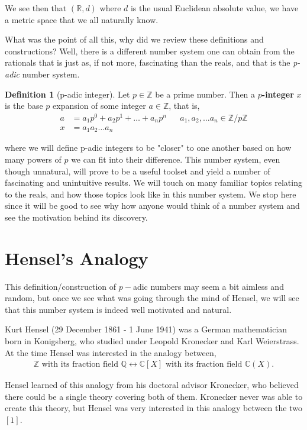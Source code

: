 \documentclass[12pt]{article}
\theoremstyle{definition}
\newtheorem{definition}{Definition}[section]
\theoremstyle{remark}
\newcommand{\zz}{\mathbb Z}   %
\newcommand{\qq}{\mathbb Q}   %
\newcommand{\rr}{\mathbb R}   %
\newcommand{\cc}{\mathbb C}   %
\newcommand{\lrb}[1]{\left[#1\right]}
\begin{document}
We see then that $(\rr, d)$ where $d$ is the usual Euclidean absolute value, we have a metric space that we all naturally know. 

What was the point of all this, why did we review these definitions and constructions? Well, there is a different number system one can obtain from the rationals that is just as, if not more, fascinating than the reals, and that is the \textit{p-adic} number system. 

\begin{definition} [p-adic integer]
  Let $p \in \zz$ be a prime number. Then a \textbf{$p$-integer} $x$ is the base $p$ expansion of some integer $a\in \zz$, that is,
  \begin{align*}
    a &= a_1p^{0} + a_2p^{1} + \dots + a_np^{n}  && a_1,a_2, \dots a_n \in \zz/p\zz\\
    x &= a_1a_2\dots a_n
  \end{align*}
\end{definition}
where we will define p-adic integers to be "closer" to one another based on how many powers of $p$ we can fit into their difference. This number system, even though unnatural, will prove to be a useful toolset and yield a number of fascinating and unintuitive results. We will touch on many familiar topics relating to the reals, and how those topics look like in this number system. We stop here since it will be good to see why how anyone would think of a number system and see the motivation behind its discovery.  

\section{Hensel's Analogy}
This definition/construction of $p-$adic numbers may seem a bit aimless and random, but once we see what was going through the mind of Hensel, we will see that this number system is indeed well motivated and natural. 

Kurt Hensel (29 December 1861 - 1 June 1941) was a German mathematician born in Konigsberg, who studied under Leopold Kronecker and Karl Weierstrass. At the time Hensel was interested in the analogy between,
\begin{align*}
  \zz \text{ with its fraction field } \qq \longleftrightarrow \cc[X] \text{ with its fraction field }\cc(X).
\end{align*}

Hensel learned of this analogy from his doctoral advisor Kronecker, who believed there could be a single theory covering both of them. Kronecker never was able to create this theory, but Hensel was very interested in this analogy between the two $\lrb{1}$. 
\end{document}
